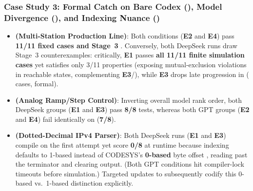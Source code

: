 \subsubsection{Case Study 3: Formal Catch on Bare Codex (), Model Divergence (), and Indexing Nuance ()}
\begin{itemize}
  \item \textbf{ (Multi-Station Production Line)}: Both  conditions (\textbf{E2} and \textbf{E4}) pass \textbf{11/11 fixed cases and Stage~3 }. Conversely, both DeepSeek runs draw Stage~3 counterexamples: critically, \textbf{E1} passes \textbf{all 11/11 finite simulation cases} yet satisfies only 3/11  properties (exposing mutual-exclusion violations in  reachable states, complementing \textbf{E3}/), while \textbf{E3} drops late progression in  ( cases,  formal).
  \item \textbf{ (Analog Ramp/Step Control)}: Inverting overall model rank order, both DeepSeek groups (\textbf{E1} and \textbf{E3}) pass \textbf{8/8} tests, whereas both GPT groups (\textbf{E2} and \textbf{E4}) fail identically on  (\textbf{7/8}).
  \item \textbf{ (Dotted-Decimal IPv4 Parser)}: Both DeepSeek runs (\textbf{E1} and \textbf{E3}) compile on the first attempt yet score \textbf{0/8} at runtime because indexing  defaults to 1-based  instead of CODESYS's \textbf{0-based}  byte offset , reading past the terminator and clearing output. (Both GPT conditions hit compiler-lock timeouts before simulation.) Targeted updates to  subsequently codify this 0-based vs.\ 1-based distinction explicitly.
\end{itemize}

